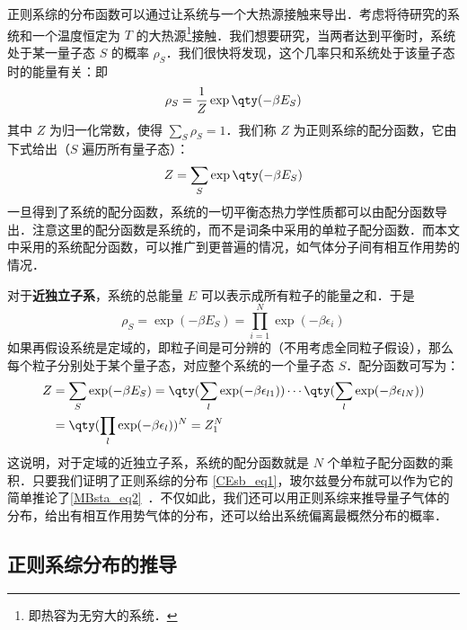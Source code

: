 
\begin{issues}
\issueDraft
\end{issues}

正则系综的分布函数可以通过让系统与一个大热源接触来导出．考虑将待研究的系统和一个温度恒定为 $T$ 的大热源\footnote{即热容为无穷大的系统．}接触．我们想要研究，当两者达到平衡时，系统处于某一量子态 $S$ 的概率 $\rho_S$．我们很快将发现，这个几率只和系统处于该量子态时的能量有关：即
\begin{equation}\label{CEsb_eq1}
\rho_S=\frac{1}{Z}\exp\qty(-\beta E_S)
\end{equation}
其中 $Z$ 为归一化常数，使得 $\sum_S \rho_S=1$．我们称 $Z$ 为正则系综的配分函数，它由下式给出（$S$ 遍历所有量子态）：
\begin{equation}
Z=\sum_S \exp\qty(-\beta E_S)
\end{equation}
一旦得到了系统的配分函数，系统的一切平衡态热力学性质都可以由配分函数导出．注意这里的配分函数是系统的，而不是词条中采用的单粒子配分函数．而本文中采用的系统配分函数，可以推广到更普遍的情况，如气体分子间有相互作用势的情况．

对于\textbf{近独立子系}，系统的总能量 $E$ 可以表示成所有粒子的能量之和．于是
\begin{equation}
\rho_S=\exp(-\beta E_S)=\prod_{i=1}^N\exp(-\beta\epsilon_i)
\end{equation}
如果再假设系统是定域的，即粒子间是可分辨的（不用考虑全同粒子假设），那么每个粒子分别处于某个量子态，对应整个系统的一个量子态 $S$．配分函数可写为：
\begin{equation}
\begin{aligned}
Z&=\sum_S\exp(-\beta E_S)=\qty(\sum_{l}\exp(-\beta\epsilon_{l1}))\cdots\qty(\sum_{l}\exp(-\beta\epsilon_{lN}))\\
&=\qty(\prod_{l}\exp(-\beta\epsilon_{l}))^N=Z_1^N
\end{aligned}
\end{equation}
这说明，对于定域的近独立子系，系统的配分函数就是 $N$ 个单粒子配分函数的乘积．只要我们证明了正则系综的分布 \autoref{CEsb_eq1}，玻尔兹曼分布就可以作为它的简单推论了\autoref{MBsta_eq2}~．不仅如此，我们还可以用正则系综来推导量子气体的分布，给出有相互作用势气体的分布，还可以给出系统偏离最概然分布的概率．
\subsection{正则系综分布的推导}
